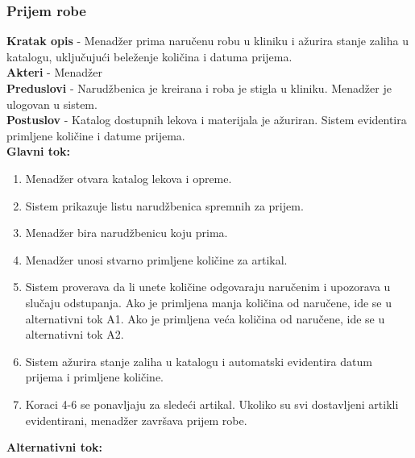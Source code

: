 \subsubsection{Prijem robe}
\indent \textbf{Kratak opis} - Menadžer prima naručenu robu u kliniku i ažurira stanje zaliha u katalogu, uključujući beleženje količina i datuma prijema. \\
\indent \textbf{Akteri} - Menadžer\\
\indent \textbf{Preduslovi} - Narudžbenica je kreirana i roba je stigla u kliniku. Menadžer je ulogovan u sistem.\\
\indent \textbf{Postuslov} - Katalog dostupnih lekova i materijala je ažuriran. Sistem evidentira primljene količine i datume prijema. \\
\indent \textbf{Glavni tok:}
\begin{enumerate}
    \item Menadžer otvara katalog lekova i opreme.
    \item Sistem prikazuje listu narudžbenica spremnih za prijem.
    \item Menadžer bira narudžbenicu koju prima.
    \item Menadžer unosi stvarno primljene količine za artikal.
    \item Sistem proverava da li unete količine odgovaraju naručenim i upozorava u slučaju odstupanja. Ako je primljena manja količina od naručene, ide se u alternativni tok A1. Ako je primljena veća količina od naručene, ide se u alternativni tok A2.
    \item Sistem ažurira stanje zaliha u katalogu i automatski evidentira datum prijema i primljene količine.
    \item Koraci 4-6 se ponavljaju za sledeći artikal. Ukoliko su svi dostavljeni artikli evidentirani, menadžer završava prijem robe.
\end{enumerate}
\indent \textbf{Alternativni tok:}
